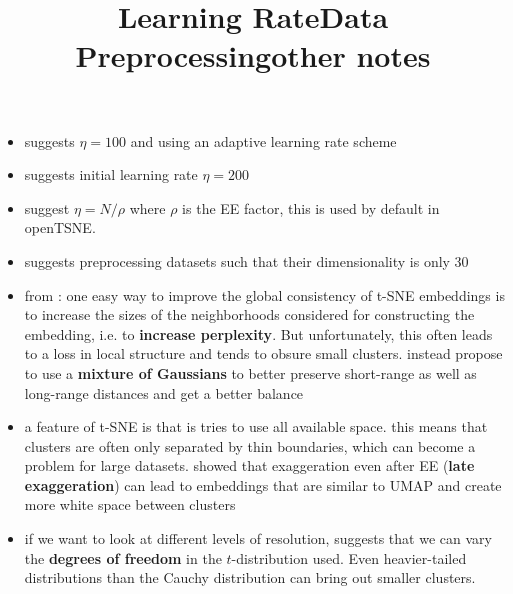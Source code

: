 \title{Learning Rate}
\begin{itemize}
  \item \cite{vdMaa08} suggests $\eta =100$ and using an adaptive learning rate scheme 
  \item \cite{vdMaa14} suggests initial learning rate $\eta=200$ 
  \item \cite{belkina19} suggest $\eta = N/\rho$ where $\rho$ is the EE factor, this is used by default in openTSNE. 
\end{itemize}

\title{Data Preprocessing}
\begin{itemize}
  \item \cite{vdMaa08} suggests preprocessing datasets such that their dimensionality is only $30$ 
\end{itemize}

\title{other notes}
\begin{itemize}
  \item from \cite{openTSNE}: one easy way to improve the global consistency of t-SNE embeddings is to increase the sizes of the neighborhoods considered for constructing the embedding, i.e. to \textbf{increase perplexity}. But unfortunately, this often leads to a loss in local structure and tends to obsure small clusters. \cite{KoBe19SingleCell} instead propose to use a \textbf{mixture of Gaussians} to better preserve short-range as well as long-range distances and get a better balance 
  \item a feature of t-SNE is that is tries to use all available space. this means that clusters are often only separated by thin boundaries, which can become a problem for large datasets. \cite{BoehmBerens22} showed that exaggeration even after EE (\textbf{late exaggeration}) can lead to embeddings that are similar to UMAP and create more white space between clusters 
  \item if we want to look at different levels of resolution, \cite{Ko20HeavyTails} suggests that we can vary the \textbf{degrees of freedom} in the $t$-distribution used. Even heavier-tailed distributions than the Cauchy distribution can bring out smaller clusters. 
\end{itemize}

